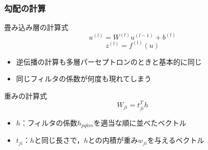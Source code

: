 \documentclass[dvipdfmx,11pt,notheorems]{beamer}
\theoremstyle{definition}
\begin{document}




\begin{frame}[fragile]\frametitle{勾配の計算}

 \begin{block}{畳み込み層の計算式}
  \begin{equation}
   u^{(l)} = W^{(l)} u^{(l-1)} + b^{(l)}
  \end{equation}
  \begin{equation}
   z^{(l)} = f^{(l)} (u)
  \end{equation}
 \end{block}

 \begin{itemize}
  \item 逆伝播の計算も多層パーセプトロンのときと基本的に同じ
  \item 同じフィルタの係数が何度も現れてしまう
 \end{itemize}

 \begin{block}{重みの計算式}
  \begin{equation}
   W_{ji} = t_{ji}^{T} h
  \end{equation}
 \end{block}

 \begin{itemize}
  \item $h$：フィルタの係数$h_{pqkm}$を適当な順に並べたベクトル
  \item $t_{ji}$：$h$と同じ長さで，$h$との内積が重み$w_{ji}$を与えるベクトル
 \end{itemize}

\end{frame}
\end{document}

